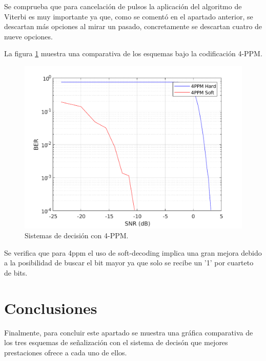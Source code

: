 Se comprueba que para cancelación de pulsos la aplicación del algoritmo de Viterbi 
es muy importante ya que, como se comentó en el apartado anterior, se descartan más 
opciones al mirar un pasado, concretamente se descartan cuatro de nueve opciones.

La figura \ref{4ppm} muestra una comparativa de los esquemas bajo 
la codificación 4-PPM.

\begin{figure}[ht]
    \centering
    \includegraphics[scale=0.6]{./figuras/4ppm.pdf}
    \caption{\small{Sistemas de decisión con 4-PPM.}}
    \label{4ppm}%
\end{figure}

Se verifica que para 4ppm el uso de soft-decoding implica una gran mejora debido a 
la posibilidad de buscar el bit mayor ya que solo se recibe un '1' por cuarteto de bits.

\section{Conclusiones}
Finalmente, para concluir este apartado se muestra una gráfica comparativa de los 
tres esquemas de señalización con el sistema de decisón que mejores prestaciones ofrece
a cada uno de ellos.

